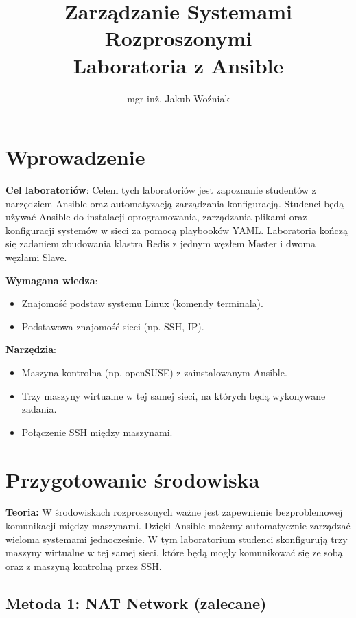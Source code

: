 \documentclass{article}
\title{Zarządzanie Systemami Rozproszonymi\\Laboratoria z Ansible}
\author{mgr inż. Jakub Woźniak}
\date{}
\begin{document}
\maketitle

\section*{Wprowadzenie}

\textbf{Cel laboratoriów}:  
Celem tych laboratoriów jest zapoznanie studentów z narzędziem Ansible oraz automatyzacją zarządzania konfiguracją. Studenci będą używać Ansible do instalacji oprogramowania, zarządzania plikami oraz konfiguracji systemów w sieci za pomocą playbooków YAML. Laboratoria kończą się zadaniem zbudowania klastra Redis z jednym węzłem Master i dwoma węzłami Slave.

\textbf{Wymagana wiedza}:  
\begin{itemize}
    \item Znajomość podstaw systemu Linux (komendy terminala).
    \item Podstawowa znajomość sieci (np. SSH, IP).
\end{itemize}

\textbf{Narzędzia}:  
\begin{itemize}
    \item Maszyna kontrolna (np. openSUSE) z zainstalowanym Ansible.
    \item Trzy maszyny wirtualne w tej samej sieci, na których będą wykonywane zadania.
    \item Połączenie SSH między maszynami.
\end{itemize}

\section{Przygotowanie środowiska}

\textbf{Teoria:}  
W środowiskach rozproszonych ważne jest zapewnienie bezproblemowej komunikacji między maszynami. Dzięki Ansible możemy automatycznie zarządzać wieloma systemami jednocześnie. W tym laboratorium studenci skonfigurują trzy maszyny wirtualne w tej samej sieci, które będą mogły komunikować się ze sobą oraz z maszyną kontrolną przez SSH.

\subsection*{Metoda 1: NAT Network (zalecane)}
\end{document}
